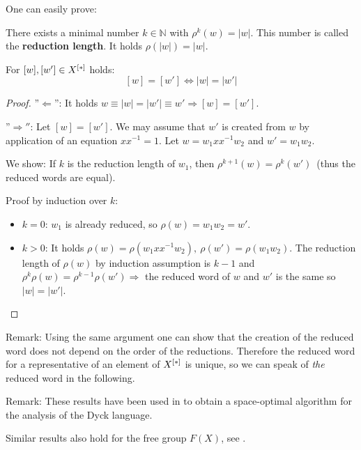 One can easily prove:

\begin{lemma}
There exists a minimal number $k \in \mathbb{N}$ with $\rho^k(w) = |w|$. This
number is called the {\bf reduction length}. It holds $\rho(|w|) = |w|$.
\end{lemma}

\bigskip
\begin{lemma}
For $[w], [w'] \in \mbox{${X}^{[*]}$}$ holds:
\[ [w] = [w'] \iff |w| = |w'| \]
\end{lemma}

\begin{proof}
''$\Leftarrow$'': It holds $w \equiv |w| = |w'| \equiv w' \Rightarrow [w] =
[w']$.

''$\Rightarrow''$: Let $[w] = [w']$. We may assume that $w'$ is created from $w$
by application of an equation $x x^{-1} = 1$. Let $w = w_1 x x^{-1} w_2$ and $w' = w_1 w_2$.

We show: If $k$ is the reduction length of $w_1$, then $\rho^{k+1}(w) =
\rho^k(w')$\ (thus the reduced words are equal).

Proof by induction over $k$:
\begin{itemize}
  \item  $k = 0$: $w_1$ is already reduced, so $\rho(w) = w_1 w_2 = w'$.
  \item $k > 0$: It holds $\rho(w) = \rho(w_1 x x^{-1} w_2),\ \rho(w') = \rho(w_1
w_2)$. The reduction length of $\rho(w)$ by induction assumption is $k-1$ and
$\rho^k \rho(w) = \rho^{k-1}\rho(w') \Rightarrow$ the reduced word of $w$ and
$w'$ is the same so $|w| = |w'|$.
\end{itemize}
\end{proof}

Remark: Using the same argument one can show that the creation of the reduced
word does not depend on the order of the reductions. Therefore the reduced word
for a representative of an element of $\mbox{${X}^{[*]}$}$ is unique, so we can speak of {\em the} 
reduced word in the following.

Remark: These results have been used in \cite{HotzMesserschmidt} to obtain a
space-optimal algorithm for the analysis of the Dyck language.

Similar results also hold for the free group $F(X)$, see \cite{CrowellFox}.
